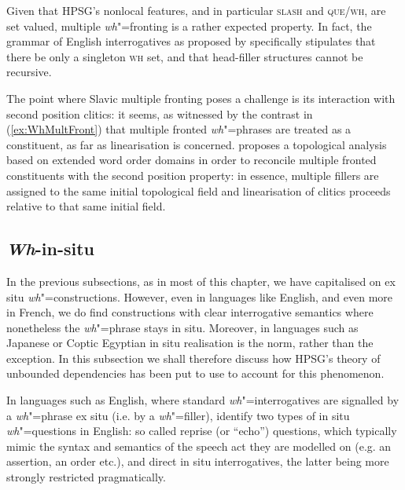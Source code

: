 \documentclass[output=paper
                ,modfonts
                ,nonflat
	        ,collection
	        ,collectionchapter
	        ,collectiontoclongg
 	        ,biblatex
                ,babelshorthands
                ,newtxmath
                ,draftmode
                ,colorlinks, citecolor=brown
]{./langsci/langscibook}
\begin{document}
{\begin{exe}
\begin{xlist}
  \end{xlist}
\end{exe}

\noindent
Given that HPSG's nonlocal features, and in particular \textsc{slash}
and \textsc{que/wh}, are set valued, multiple \emph{wh}"=fronting is a rather
expected property. In fact, the grammar of English interrogatives as
proposed by \citet{Ginzburg:Sag:01} specifically stipulates that there
be only a singleton \textsc{wh} set, and that head-filler structures
cannot be recursive.

The point where Slavic multiple fronting poses a challenge is its interaction with second position clitics:  it seems, as witnessed by the contrast in (\ref{ex:WhMultFront}) that multiple fronted \emph{wh}"=phrases are treated as a constituent, as far as linearisation is concerned. \citet{Penn:99} proposes a topological analysis based on extended word order domains \citep{Reape:90,kathol_a00} in order to reconcile multiple fronted constituents with the second position property: in essence, 
multiple fillers are assigned to the same initial topological field and linearisation of clitics proceeds relative to that same initial field.   


\subsection{\emph{Wh}-in-situ}
\label{sec:UDC:WhInSitu}

In the previous subsections, as in most of this chapter, we have capitalised on ex situ \emph{wh}"=constructions. However, even in languages like English, and even more in French, we do find constructions with clear interrogative semantics where nonetheless the \emph{wh}"=phrase stays in situ. Moreover, in languages such as Japanese or Coptic Egyptian in situ realisation is the norm, rather than the exception. In this subsection we shall therefore discuss how HPSG's theory of unbounded dependencies has been put to use to account for this phenomenon. 

In languages such as English, where  standard \emph{wh}"=interrogatives are signalled by a \emph{wh}"=phrase ex situ (i.e. by a \emph{wh}"=filler),   
\citet{Ginzburg:Sag:01} identify two types of in situ \emph{wh}"=questions in English: so called reprise (or ``echo'') questions, which typically mimic
the syntax and semantics of the speech act they are modelled on (e.g. an assertion, an order etc.),  and direct in situ interrogatives, the latter being more strongly restricted pragmatically. %

}
\end{document}
